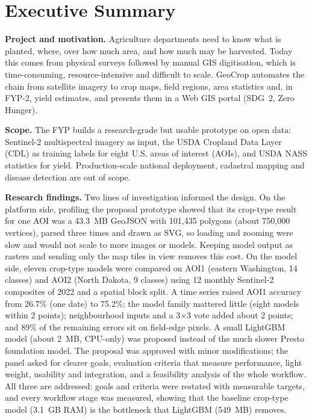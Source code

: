 \chapter*{Executive Summary}
\thispagestyle{plain}

\textbf{Project and motivation.} Agriculture departments need to know what is planted, where, over
how much area, and how much may be harvested. Today this comes from physical surveys followed by
manual GIS digitisation, which is time-consuming, resource-intensive and difficult to scale.
GeoCrop automates the chain from satellite imagery to crop maps, field regions, area statistics
and, in FYP-2, yield estimates, and presents them in a Web GIS portal (SDG~2, Zero Hunger).

\textbf{Scope.} The FYP builds a research-grade but usable prototype on open data: Sentinel-2
multispectral imagery as input, the USDA Cropland Data Layer (CDL) as training labels for eight
U.S. areas of interest (AOIs), and USDA NASS statistics for yield. Production-scale national
deployment, cadastral mapping and disease detection are out of scope.

\textbf{Research findings.} Two lines of investigation informed the design. On the platform side,
profiling the proposal prototype showed that its crop-type result for one AOI was a 43.3~MB GeoJSON
with 101,435 polygons (about 750,000 vertices), parsed three times and drawn as SVG, so loading and
zooming were slow and would not scale to more images or models. Keeping model output as rasters and
sending only the map tiles in view removes this cost. On the model side, eleven crop-type models
were compared on AOI1 (eastern Washington, 14 classes) and AOI2 (North Dakota, 9 classes) using
12 monthly Sentinel-2 composites of 2022 and a spatial block split. A time series raised AOI1
accuracy from 26.7\% (one date) to 75.2\%; the model family mattered little (eight models within
2 points); neighbourhood inputs and a 3$\times$3 vote added about 2 points; and 89\% of the remaining
errors sit on field-edge pixels. A small LightGBM model (about 2~MB, CPU-only) was proposed instead of
the much slower Presto foundation model. The proposal was approved with minor modifications; the
panel asked for clearer goals, evaluation criteria that measure performance, light weight, usability
and integration, and a feasibility analysis of the whole workflow. All three are addressed: goals
and criteria were restated with measurable targets, and every workflow stage was measured, showing
that the baseline crop-type model (3.1~GB RAM) is the bottleneck that LightGBM (549~MB) removes.

